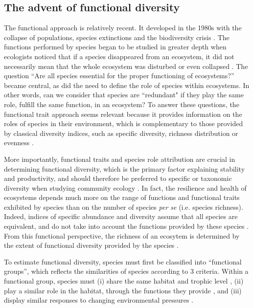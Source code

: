 \subsection{The advent of functional diversity}
The functional approach is relatively recent. It developed in the 1980s with the collapse of populations, species extinctions and the biodiversity crisis \citep{wilson1988}. The functions performed by species began to be studied in greater depth when ecologists noticed that if a species disappeared from an ecosystem, it did not necessarily mean that the whole ecosystem was disturbed or even collapsed \citep{mejri2009}. The question ``Are all species essential for the proper functioning of ecosystems?'' became central, as did the need to define the role of species within ecosystems. In other words, can we consider that species are ``redundant" if they play the same role, fulfill the same function, in an ecosystem? To answer these questions, the functional trait approach seems relevant because it provides information on the roles of species in their environment, which is complementary to those provided by classical diversity indices, such as specific diversity, richness distribution or evenness \citep{marcon2015,mejri2009}. 

More importantly, functional traits and species role attribution are crucial in determining functional diversity, which is the primary factor explaining stability and productivity, and should therefore be preferred to specific or taxonomic diversity when studying community ecology \citep{dumay2004,mejri2009}. In fact, the resilience and health of ecosystems depends much more on the range of functions and functional traits exhibited by species than on the number of species \textit{per se} (i.e. species richness). Indeed, indices of specific abundance and diversity assume that all species are equivalent, and do not take into account the functions provided by these species \citep{mejri2009}. From this functional perspective, the richness of an ecosytem is determined by the extent of functional diversity provided by the species \citep{rocklin2004}. 

To estimate functional diversity, species must first be classified into ``functional groups'', which reflects the similarities of species according to 3 criteria. Within a functional group, species must (i) share the same habitat and trophic level \citep{brindamour2016}, (ii) play a similar role in the habitat, through the functions they provide \citep{dumay2004,mejri2009}, and (iii) display similar responses to changing environmental pressures \citep{brindamour2016,dumay2004,mejri2009}.

